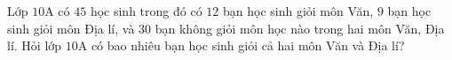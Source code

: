 \begin{ex}
Lớp $10$A có $45$ học sinh trong đó có $12$ bạn học sinh giỏi môn Văn, $9$ bạn học sinh giỏi môn Địa lí, và $30$ bạn không giỏi môn học nào trong hai môn Văn, Địa lí. Hỏi lớp $10$A có bao nhiêu bạn học sinh giỏi cả hai môn Văn và Địa lí?
\end{ex}
